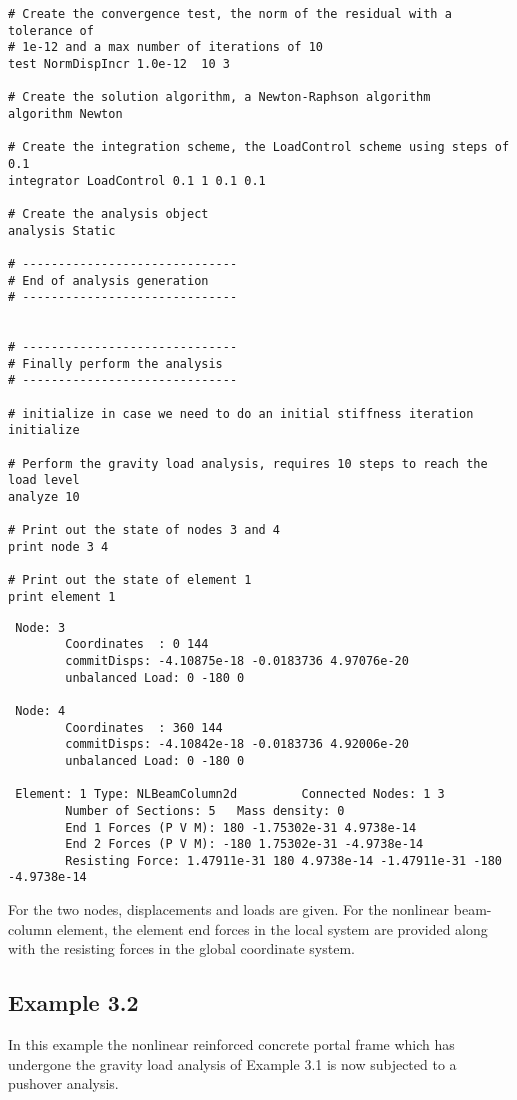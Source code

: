 \documentclass[12pt]{article}
\begin{document}
{\begin{verbatim}
# Create the convergence test, the norm of the residual with a tolerance of 
# 1e-12 and a max number of iterations of 10
test NormDispIncr 1.0e-12  10 3

# Create the solution algorithm, a Newton-Raphson algorithm
algorithm Newton

# Create the integration scheme, the LoadControl scheme using steps of 0.1 
integrator LoadControl 0.1 1 0.1 0.1

# Create the analysis object
analysis Static

# ------------------------------
# End of analysis generation
# ------------------------------


# ------------------------------
# Finally perform the analysis
# ------------------------------

# initialize in case we need to do an initial stiffness iteration
initialize

# Perform the gravity load analysis, requires 10 steps to reach the load level
analyze 10

# Print out the state of nodes 3 and 4
print node 3 4

# Print out the state of element 1
print element 1
\end{verbatim}
}

\vspace{0.2in} 

{\sf\small
\begin{verbatim}
 Node: 3
        Coordinates  : 0 144 
        commitDisps: -4.10875e-18 -0.0183736 4.97076e-20 
        unbalanced Load: 0 -180 0 

 Node: 4
        Coordinates  : 360 144 
        commitDisps: -4.10842e-18 -0.0183736 4.92006e-20 
        unbalanced Load: 0 -180 0 

 Element: 1 Type: NLBeamColumn2d         Connected Nodes: 1 3 
        Number of Sections: 5   Mass density: 0
        End 1 Forces (P V M): 180 -1.75302e-31 4.9738e-14
        End 2 Forces (P V M): -180 1.75302e-31 -4.9738e-14
        Resisting Force: 1.47911e-31 180 4.9738e-14 -1.47911e-31 -180 -4.9738e-14 

\end{verbatim}
}

For the two nodes, displacements and loads are given. For the
nonlinear beam-column element, the element end forces in the local
system are provided along with the resisting forces in the global
coordinate system.

\pagebreak
\subsection{Example 3.2}
In this example the nonlinear reinforced concrete portal frame which
has undergone the gravity load analysis of Example 3.1 is now
subjected to a pushover analysis.
\end{document}
